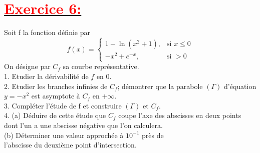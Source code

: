 \documentclass[12pt]{article}
\begin{document}
\section*{\underline{\textbf{\textcolor{red}{Exercice 6:}}}}
Soit f la fonction définie par
\[ f(x) = \begin{cases} 
  1-\ln(x^{2}+1), & \text{si } x \leq 0 \\
  -x^{2}+e^{-x}, & \text{si } > 0
\end{cases} \]
On désigne par $C_{f}$ sa courbe représentative.\\
1. Etudier la dérivabilité de $f$ en 0.\\
2. Etudier les branches infinies de $C_{f}$; démontrer que la parabole $(\Gamma)$ d’équation $y=-x^{2}$ est asymptote à $C_{f}$
en $+\infty$.\\
3. Compléter l’étude de f et construire $(\Gamma)$ et $C_{f}$.\\
4. (a) Déduire de cette étude que $C_{f}$ coupe l’axe des abscisses en deux points dont l’un a une abscisse négative que l’on calculera.\\
(b) Déterminer une valeur approchée à $10^{-1}$ près de\\ l’abscisse du deuxième point d’intersection.\\
\end{document}
